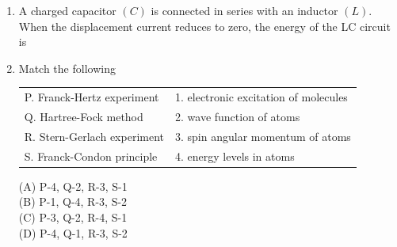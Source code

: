 \documentclass[journal,13pt,onecolumn]{IEEEtran}
\begin{document}
\begin{enumerate}[itemsep = 1em]
\hfill{}


\begin{enumerate}
\end{enumerate}

\item A charged capacitor $(C)$ is connected in series with an inductor $(L)$. When the displacement current reduces to zero, the energy of the LC circuit is

\hfill{}


\begin{enumerate}
\end{enumerate}


    
\item Match the following

\hfill{}

\begin{tabular}{@{}ll}
P. Franck-Hertz experiment & 1. electronic excitation of molecules \\
Q. Hartree-Fock method     & 2. wave function of atoms \\
R. Stern-Gerlach experiment & 3. spin angular momentum of atoms \\
S. Franck-Condon principle & 4. energy levels in atoms
\end{tabular}

\vspace{0.5em}

\begin{multicols}{4}
(A) P-4, Q-2, R-3, S-1 \\
(B) P-1, Q-4, R-3, S-2 \\
(C) P-3, Q-2, R-4, S-1 \\
(D) P-4, Q-1, R-3, S-2
\end{multicols}



\end{enumerate}
\end{document}
